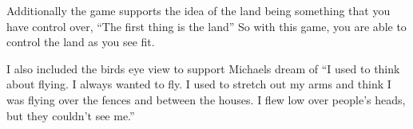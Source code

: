 \documentclass{article}
\begin{document}
Additionally the game supports the idea of the land being something that you have control over, ``The first thing is the land'' So with this game, you are able to control the land as you see fit. 

I also included the birds eye view to support Michaels dream of ``I used to think about flying. I always wanted to fly. I used to stretch out my arms and think I was flying over the fences and between the houses. I flew low over people's heads, but they couldn't see me.'' 
\end{document}
